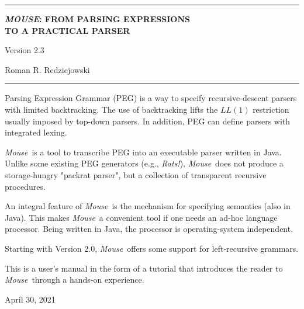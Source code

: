 \documentclass[a4paper,fleqn]{article}
\newcommand{\Version}{2.3}
\newcommand{\Mouse}{\textsl{Mouse}}
\begin{document}
\selectfont

\pagestyle{empty}
\begin{center}
\rule{\linewidth-20mm}{.5mm}

\bigskip
\Large \textbf{\textit{MOUSE}: FROM PARSING EXPRESSIONS\\TO A PRACTICAL PARSER}

\bigskip
\Large Version \Version

\bigskip
\Large Roman R. Redziejowski
\rule{\linewidth-20mm}{.5mm}




\normalsize
\parbox{0.875\linewidth}{
\noindent
Parsing Expression Grammar (PEG) is a way to specify
recursive-descent parsers with limited backtracking.
The use of backtracking lifts the $LL(1)$ restriction usually imposed
by top-down parsers.
In addition, PEG can define parsers with integrated lexing.

\medskip
\noindent
\Mouse\ is a tool to transcribe PEG into an executable parser written in Java.
Unlike some existing PEG generators (e.g., \textsl{Rats!}), \Mouse\
does not produce a storage-hungry "packrat parser",
but a collection of transparent recursive procedures.

\medskip
\noindent
An integral feature of \Mouse\ is the mechanism for specifying
semantics (also in Java).
This makes \Mouse\ a convenient tool if one needs an ad-hoc language processor.
Being written in Java, the processor is operating-system independent.

\medskip
\noindent
Starting with Version 2.0, \Mouse\ offers some support for left-recursive grammars.

\medskip
\noindent
This is a user's manual in the form of a tutorial
that introduces the reader to \Mouse\ through 
a hands-on experience.}
\end{center}


\begin{center}
April 30, 2021

\end{center}
\newpage
\end{document}
